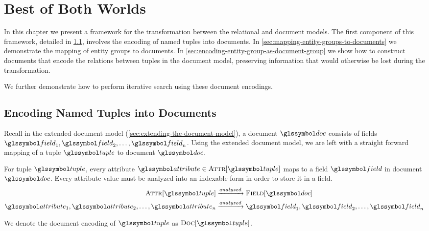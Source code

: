 \chapter{Best of Both Worlds}
\label{chap:best-of-both-worlds}
	In this chapter we present a framework for the transformation between the relational and document models.  The first component of this framework, detailed in \cref{sec:named-tuples-documents}, involves the encoding of named tuples into documents.  In \cref{sec:mapping-entity-groups-to-documents} we demonstrate the mapping of entity groups to documents.  In \cref{sec:encoding-entity-group-as-document-group} we show how to construct documents that encode the relations between tuples in the document model, preserving information that would otherwise be lost during the transformation.
	
	We further demonstrate how to perform iterative search using these document encodings.
	
	\section{Encoding Named Tuples into Documents}
	\label{sec:named-tuples-documents}
		Recall in the extended document model (\cref{sec:extending-the-document-model}), a document \(\doc\) consists of fields \(\field_1, \field_2, \dotsc, \field_n\).  Using the extended document model, we are left with a straight forward mapping of a tuple \(\tuple\) to document \(\doc\).
		
		For tuple \(\tuple\), every attribute \(\attribute \in \attributes{\tuple}\) maps to a field \(\field\) in document \(\doc\).	Every attribute value must be analyzed into an indexable form in order to store it in a field.
		\begin{align}
			\attributes{\tuple} &\xrightarrow{analyzed} \fields{\doc} \\
			\attribute_1, \attribute_2, \dotsc, \attribute_n &\xrightarrow{analyzed} \field_1, \field_2, \dotsc, \field_n
		\end{align}
		
		We denote the document encoding of \(\tuple\) as \(\docs{\tuple}\).
		
